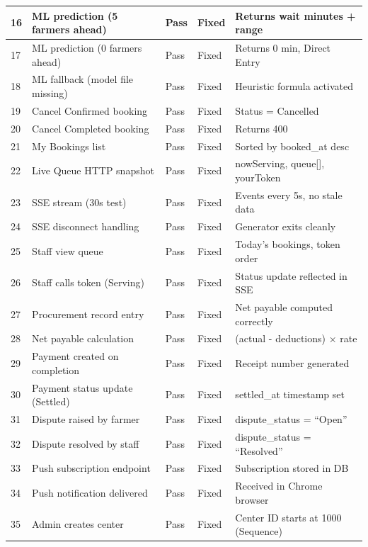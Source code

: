 \begin{longtable}{|p{0.4cm}|p{3.8cm}|p{1.6cm}|p{1.5cm}|p{5.8cm}|}
16 & ML prediction (5 farmers ahead)      & Pass & Fixed & Returns wait minutes + range \\ \hline
17 & ML prediction (0 farmers ahead)      & Pass & Fixed & Returns 0 min, Direct Entry \\ \hline
18 & ML fallback (model file missing)     & Pass & Fixed & Heuristic formula activated \\ \hline
19 & Cancel Confirmed booking             & Pass & Fixed & Status = Cancelled \\ \hline
20 & Cancel Completed booking             & Pass & Fixed & Returns 400 \\ \hline
21 & My Bookings list                     & Pass & Fixed & Sorted by booked\_at desc \\ \hline
22 & Live Queue HTTP snapshot             & Pass & Fixed & nowServing, queue[], yourToken \\ \hline
23 & SSE stream (30s test)                & Pass & Fixed & Events every 5s, no stale data \\ \hline
24 & SSE disconnect handling              & Pass & Fixed & Generator exits cleanly \\ \hline
25 & Staff view queue                     & Pass & Fixed & Today's bookings, token order \\ \hline
26 & Staff calls token (Serving)          & Pass & Fixed & Status update reflected in SSE \\ \hline
27 & Procurement record entry             & Pass & Fixed & Net payable computed correctly \\ \hline
28 & Net payable calculation              & Pass & Fixed & (actual - deductions) × rate \\ \hline
29 & Payment created on completion        & Pass & Fixed & Receipt number generated \\ \hline
30 & Payment status update (Settled)      & Pass & Fixed & settled\_at timestamp set \\ \hline
31 & Dispute raised by farmer             & Pass & Fixed & dispute\_status = ``Open'' \\ \hline
32 & Dispute resolved by staff            & Pass & Fixed & dispute\_status = ``Resolved'' \\ \hline
33 & Push subscription endpoint           & Pass & Fixed & Subscription stored in DB \\ \hline
34 & Push notification delivered          & Pass & Fixed & Received in Chrome browser \\ \hline
35 & Admin creates center                 & Pass & Fixed & Center ID starts at 1000 (Sequence) \\ \hline

\end{longtable}
